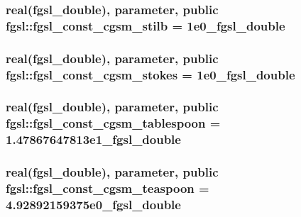 \subsubsection[{fgsl\+\_\+const\+\_\+cgsm\+\_\+stilb}]{\setlength{\rightskip}{0pt plus 5cm}real({\bf fgsl\+\_\+double}), parameter, public fgsl\+::fgsl\+\_\+const\+\_\+cgsm\+\_\+stilb = 1e0\+\_\+fgsl\+\_\+double}\label{namespacefgsl_a8f6eb902874b66bc00a4959e7444cb1a}
\hypertarget{namespacefgsl_a3d38806d98751c252e4450fb1df5b246}{}
\subsubsection[{fgsl\+\_\+const\+\_\+cgsm\+\_\+stokes}]{\setlength{\rightskip}{0pt plus 5cm}real({\bf fgsl\+\_\+double}), parameter, public fgsl\+::fgsl\+\_\+const\+\_\+cgsm\+\_\+stokes = 1e0\+\_\+fgsl\+\_\+double}\label{namespacefgsl_a3d38806d98751c252e4450fb1df5b246}
\hypertarget{namespacefgsl_ad8c01acfc1ba5ba62f1c97aa1b0d8142}{}
\subsubsection[{fgsl\+\_\+const\+\_\+cgsm\+\_\+tablespoon}]{\setlength{\rightskip}{0pt plus 5cm}real({\bf fgsl\+\_\+double}), parameter, public fgsl\+::fgsl\+\_\+const\+\_\+cgsm\+\_\+tablespoon = 1.\+47867647813e1\+\_\+fgsl\+\_\+double}\label{namespacefgsl_ad8c01acfc1ba5ba62f1c97aa1b0d8142}
\hypertarget{namespacefgsl_a46a096885f2709ea27ce6f1b8f59c279}{}
\subsubsection[{fgsl\+\_\+const\+\_\+cgsm\+\_\+teaspoon}]{\setlength{\rightskip}{0pt plus 5cm}real({\bf fgsl\+\_\+double}), parameter, public fgsl\+::fgsl\+\_\+const\+\_\+cgsm\+\_\+teaspoon = 4.\+92892159375e0\+\_\+fgsl\+\_\+double}\label{namespacefgsl_a46a096885f2709ea27ce6f1b8f59c279}
\hypertarget{namespacefgsl_af0bb6a664a268b6db97ed93021e98828}{}
